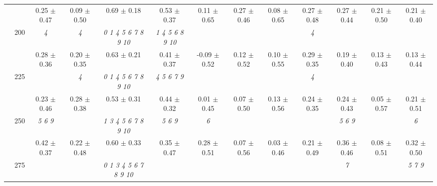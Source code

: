 \begin{table}[h]
{\begin{tabular}{
        ccccccccccccc}
 & & \cellcolor[HTML]{EFEFEF} 0.25 $\pm$ 0.47& \cellcolor[HTML]{EFEFEF} 0.09 $\pm$ 0.50& \cellcolor[HTML]{EFEFEF} 0.69 $\pm$ 0.18& \cellcolor[HTML]{EFEFEF} 0.53 $\pm$ 0.37& \cellcolor[HTML]{EFEFEF} 0.11 $\pm$ 0.65& \cellcolor[HTML]{EFEFEF} 0.27 $\pm$ 0.46& \cellcolor[HTML]{EFEFEF} 0.08 $\pm$ 0.65& \cellcolor[HTML]{EFEFEF} 0.27 $\pm$ 0.48& \cellcolor[HTML]{EFEFEF} 0.27 $\pm$ 0.44& \cellcolor[HTML]{EFEFEF} 0.21 $\pm$ 0.50& \cellcolor[HTML]{EFEFEF} 0.21 $\pm$ 0.40 \\ 
 & \multirow{2}{*}{200}& \textit{ 4 }& \textit{ 4 }& \textit{  0  1  4  5  6  7  8  9 10 }& \textit{  1  4  5  6  8  9 10 }& & & & \textit{ 4 }& & &  \\ 
 & & 0.28 $\pm$ 0.36& 0.20 $\pm$ 0.35& 0.63 $\pm$ 0.21& 0.41 $\pm$ 0.37& -0.09 $\pm$ 0.52& 0.12 $\pm$ 0.52& 0.10 $\pm$ 0.55& 0.29 $\pm$ 0.35& 0.19 $\pm$ 0.40& 0.13 $\pm$ 0.43& 0.13 $\pm$ 0.44 \\ 
 & \multirow{2}{*}{225}& \cellcolor[HTML]{EFEFEF} & \cellcolor[HTML]{EFEFEF} \textit{ 4 }& \cellcolor[HTML]{EFEFEF} \textit{  0  1  4  5  6  7  8  9 10 }& \cellcolor[HTML]{EFEFEF} \textit{ 4 5 6 7 9 }& \cellcolor[HTML]{EFEFEF} & \cellcolor[HTML]{EFEFEF} & \cellcolor[HTML]{EFEFEF} & \cellcolor[HTML]{EFEFEF} \textit{ 4 }& \cellcolor[HTML]{EFEFEF} & \cellcolor[HTML]{EFEFEF} & \cellcolor[HTML]{EFEFEF}  \\ 
 & & \cellcolor[HTML]{EFEFEF} 0.23 $\pm$ 0.46& \cellcolor[HTML]{EFEFEF} 0.28 $\pm$ 0.38& \cellcolor[HTML]{EFEFEF} 0.53 $\pm$ 0.31& \cellcolor[HTML]{EFEFEF} 0.44 $\pm$ 0.32& \cellcolor[HTML]{EFEFEF} 0.01 $\pm$ 0.45& \cellcolor[HTML]{EFEFEF} 0.07 $\pm$ 0.50& \cellcolor[HTML]{EFEFEF} 0.13 $\pm$ 0.56& \cellcolor[HTML]{EFEFEF} 0.24 $\pm$ 0.35& \cellcolor[HTML]{EFEFEF} 0.24 $\pm$ 0.43& \cellcolor[HTML]{EFEFEF} 0.05 $\pm$ 0.57& \cellcolor[HTML]{EFEFEF} 0.21 $\pm$ 0.51 \\ 
 & \multirow{2}{*}{250}& \textit{ 5 6 9 }& & \textit{  1  3  4  5  6  7  8  9 10 }& \textit{ 5 6 9 }& \textit{ 6 }& & & & \textit{ 5 6 9 }& & \textit{ 6 } \\ 
 & & 0.42 $\pm$ 0.37& 0.22 $\pm$ 0.48& 0.60 $\pm$ 0.33& 0.35 $\pm$ 0.47& 0.28 $\pm$ 0.51& 0.07 $\pm$ 0.56& 0.03 $\pm$ 0.46& 0.21 $\pm$ 0.49& 0.36 $\pm$ 0.46& 0.08 $\pm$ 0.51& 0.32 $\pm$ 0.50 \\ 
 & \multirow{2}{*}{275}& \cellcolor[HTML]{EFEFEF} & \cellcolor[HTML]{EFEFEF} & \cellcolor[HTML]{EFEFEF} \textit{  0  1  3  4  5  6  7  8  9 10 }& \cellcolor[HTML]{EFEFEF} & \cellcolor[HTML]{EFEFEF} & \cellcolor[HTML]{EFEFEF} & \cellcolor[HTML]{EFEFEF} & \cellcolor[HTML]{EFEFEF} & \cellcolor[HTML]{EFEFEF} \textit{ 7 }& \cellcolor[HTML]{EFEFEF} & \cellcolor[HTML]{EFEFEF} \textit{ 5 7 9 } \\ 

\end{tabular}}
\end{table}
